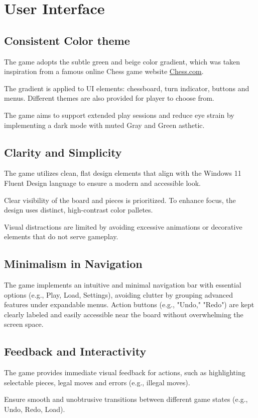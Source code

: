 \documentclass[a4paper, 10pt, titlepage]{report}
\begin{document}
\section{User Interface}
\subsection{Consistent Color theme}
The game adopts the subtle green and beige color gradient, which was taken inspiration from a famous online Chess game website \href{https://chess.com/}{Chess.com}.

The gradient is applied to UI elements: chessboard, turn indicator, buttons and menus. Different themes are also provided for player to choose from.

The game aims to support extended play sessions and reduce eye strain by implementing a dark mode with muted Gray and Green asthetic.
\subsection{Clarity and Simplicity}
The game utilizes clean, flat design elements that align with the Windows 11 Fluent Design language to ensure a modern and accessible look.

Clear visibility of the board and pieces is prioritized. To enhance focus, the design uses distinct, high-contrast color palletes.

Visual distractions are limited by avoiding excessive animations or decorative elements that do not serve gameplay.
\subsection{Minimalism in Navigation}
The game implements an intuitive and minimal navigation bar with essential options (e.g., Play, Load, Settings), avoiding clutter by grouping advanced features under expandable menus. Action buttons (e.g., "Undo," "Redo") are kept clearly labeled and easily accessible near the board without overwhelming the screen space.
\subsection{Feedback and Interactivity}
The game provides immediate visual feedback for actions, such as highlighting selectable pieces, legal moves and errors (e.g., illegal moves).

Ensure smooth and unobtrusive transitions between different game states (e.g., Undo, Redo, Load).
\end{document}
